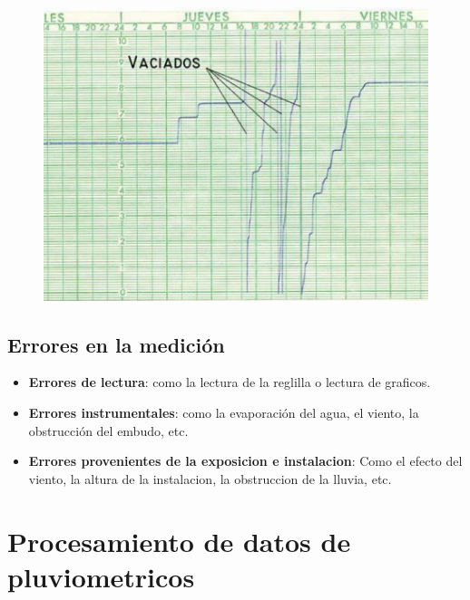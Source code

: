 \begin{figure}[!htbp]
\begin{minipage}{0.15\textwidth}
    \end{minipage}
    \hspace{0.05\textwidth} %
    \begin{minipage}{0.2\textwidth}
        \centering
        \includegraphics[width=\textwidth]{imagenes/grafico_pluviografo.png}
        \label{grafico_pluviografo}
    \end{minipage}
\end{figure}

\subsection{Errores en la medición}

\begin{itemize}
    \item \textbf{Errores de lectura}: como la lectura de la reglilla o lectura de graficos.
    \item \textbf{Errores instrumentales}: como la evaporación del agua, el viento, la obstrucción del embudo, etc.
    \item \textbf{Errores provenientes de la exposicion e instalacion}: Como el efecto del viento, la altura de la instalacion, la obstruccion de la lluvia, etc.
\end{itemize}

\section{Procesamiento de datos de pluviometricos}

